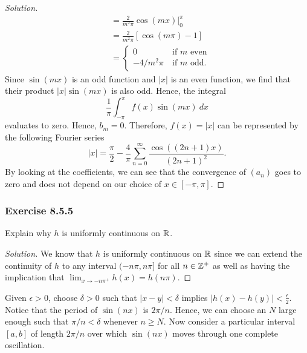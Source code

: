 \begin{enumerate}
\begin{proof}[Solution]
\begin{align*}
                      &=  \frac{ 2 }{ m^{2}\pi  }  \cos(mx) \Big|_{0}^{\pi} \\ 
                      &= \frac{ 2 }{ m^{2} \pi  } [ \cos(m \pi) - 1 ] \\
                      &= 
                      \begin{cases}
                          0 \ &\text{if } m \text{ even} \\
                          -4/ m^{2}\pi \ &\text{if } m  \text{ odd}.
                      \end{cases}
            \end{align*}
            Since \( \sin(mx)  \) is an odd function and \( | x  |  \) is an even function, we find that their product \( | x |  \sin(mx)  \) is also odd. Hence, the integral 
            \[ \frac{ 1 }{ \pi  }  \int_{ -\pi }^{ \pi   } f(x) \sin(mx)   \ dx  \]
            evaluates to zero. Hence, \( b_{m} = 0  \). Therefore, \( f(x) = | x  |  \) can be represented by the following Fourier series
            \[  | x |  = \frac{ \pi  }{ 2 }  - \frac{ 4  }{ \pi  }  \sum_{ n=0  }^{ \infty  } \frac{ \cos((2n+1)x)  }{ (2n+1)^{2}  }.  \] By looking at the coefficients, we can see that the convergence of \( (a_{n}) \) goes to zero and does not depend on our choice of \( x \in [-\pi , \pi ] \).
        \end{proof}
\end{enumerate}

\subsubsection{Exercise 8.5.5} Explain why \( h  \) is uniformly continuous on \( \mathbb{R}  \).
\begin{proof}[Solution]
    We know that \( h  \) is uniformly continuous on \( \mathbb{R}  \) since we can extend the continuity of \( h  \) to any interval \( (-n\pi, n\pi]   \) for all \( n\in \mathbb{Z}^{+} \) as well as having the implication that \( \lim_{ x \to - n \pi^{+} } h(x) = h(n\pi) \).
\end{proof}

Given \( \epsilon > 0 \), choose \( \delta > 0  \) such that \( | x - y  | < \delta  \) implies \( | h(x) - h(y) | < \frac{ \epsilon }{ 2 }  \). Notice that the period of \( \sin(nx) \) is \( 2 \pi / n  \). Hence, we can choose an \( N  \) large enough such that \( \pi / n < \delta  \) whenever \( n \geq N  \). Now
consider a particular interval \( [a,b]  \) of length \( 2 \pi / n  \) over which \( \sin(nx) \) moves through one complete oscillation.

